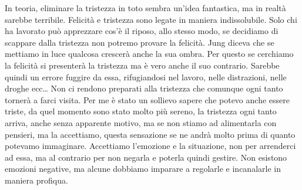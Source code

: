 \documentclass[12pt]{book} %
\begin{document}
In teoria, eliminare la tristezza in toto sembra un'idea fantastica, ma in realtà sarebbe terribile. Felicità e
tristezza sono legate in maniera indissolubile. Solo chi ha lavorato può apprezzare cos'è il riposo, allo stesso modo,
se decidiamo di scappare dalla tristezza non potremo provare la felicità. 
Jung diceva che se mettiamo in luce qualcosa crescerà anche la sua ombra. Per questo se cerchiamo la felicità si presenterà la tristezza ma è vero anche il suo contrario. Sarebbe quindi un errore fuggire da essa,
rifugiandosi nel lavoro, nelle distrazioni, nelle droghe ecc… Non ci rendono preparati alla tristezza che comunque ogni
tanto tornerà a farci visita. Per me è stato un sollievo sapere che potevo anche essere triste, da quel momento sono
stato molto più sereno, la tristezza ogni tanto arriva, anche senza apparente motivo, ma se non stiamo ad alimentarla
con pensieri, ma la accettiamo, questa sensazione se ne andrà molto prima di quanto potevamo immaginare. Accettiamo
l'emozione e la situazione, non per arrenderci ad essa, ma al contrario per non negarla e poterla quindi gestire.
Non esistono emozioni negative, ma alcune dobbiamo imparare a regolarle e incanalarle in maniera profiqua.


\bigskip
\end{document}
